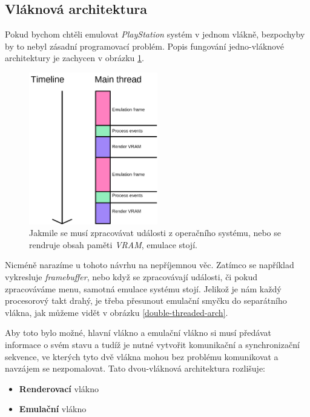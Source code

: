 \subsection{Vláknová architektura}

Pokud bychom chtěli emulovat \textit{PlayStation} systém v jednom vlákně, bezpochyby by to nebyl zásadní programovací problém. Popis fungování jedno-vláknové architektury je zachycen v obrázku \ref{single-threaded-arch}.

\begin{figure}[h]
	\centering
	\includegraphics[width=0.5\textwidth]{obrazky-figures/frontend-arch-singlethreaded.png}
	\caption[Jedno-vláknová architektura emulátoru]{Jakmile se musí zpracovávat události z operačního systému, nebo se rendruje obsah paměti \textit{VRAM},
	emulace stojí.}
	\label{single-threaded-arch}
\end{figure}

Nicméně narazíme u tohoto návrhu na nepříjemnou věc. Zatímco se například vykresluje \textit{framebuffer}, nebo když se zpracovávají
události, či pokud zpracováváme menu, samotná emulace systému stojí. Jelikož je nám každý procesorový takt drahý, je třeba přesunout
emulační smyčku do separátního vlákna, jak můžeme vidět v obrázku \ref{double-threaded-arch}.

Aby toto bylo možné, hlavní vlákno a emulační vlákno si musí předávat informace o svém stavu a tudíž je nutné vytvořit komunikační a synchronizační
sekvence, ve kterých tyto dvě vlákna mohou bez problému komunikovat a navzájem se nezpomalovat. Tato dvou-vláknová architektura rozlišuje:

\begin{itemize}
	\item{\textbf{Renderovací} vlákno}
	\item{\textbf{Emulační} vlákno}
\end{itemize}

